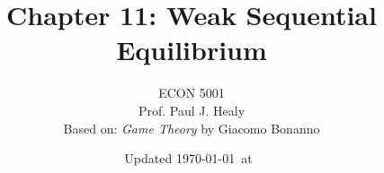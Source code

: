 

\title[Weak Sequential Equilibrium]{Chapter 11: Weak Sequential Equilibrium}
\author[ECON 5001]{ECON 5001\\Prof. Paul J. Healy\\Based on: \textit{Game Theory} by Giacomo Bonanno} \color{metrop}
\institute[OSU]{}
\date[]{\vfill {\tiny Updated \today\ at\ \DTMcurrenttime}}

%
%
